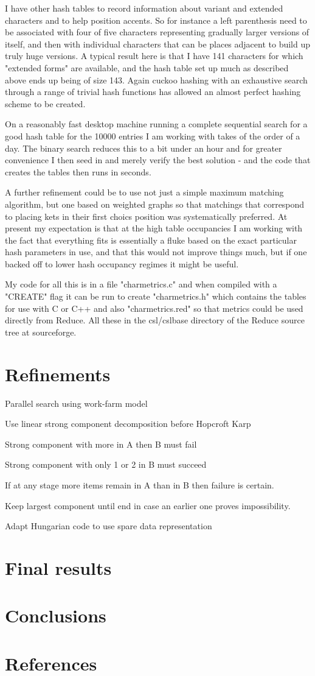 \documentclass [a4paper,11pt]{article}
\begin{document}
I have other hash tables to record information about variant and extended 
characters and to help position accents. So for instance a left 
parenthesis need to be associated with four of five characters 
representing gradually larger versions of itself, and then with individual 
characters that can be places adjacent to build up truly huge versions. 
A typical result here is that I have 141 characters for which "extended 
forms" are available, and the hash table set up much as described above 
ends up being of size 143. Again cuckoo hashing with an exhaustive search 
through a range of trivial hash functions has allowed an almost perfect 
hashing scheme to be created.

On a reasonably fast desktop machine running a complete sequential search 
for a good hash table for the 10000 entries I am working with takes of the 
order of a day. The binary search reduces this to a bit under an hour and 
for greater convenience I then seed in and merely verify the best solution 
- and the code that creates the tables then runs in seconds.

A further refinement could be to use not just a simple maximum matching 
algorithm, but one based on weighted graphs so that matchings that 
correspond to placing kets in their first choics position was 
systematically preferred. At present my expectation is that at the high 
table occupancies I am working with the fact that everything fits is 
essentially a fluke based on the exact particular hash parameters in use, 
and that this would not improve things much, but if one backed off to 
lower hash occupancy regimes it might be useful.

My code for all this is in a file "charmetrics.c" and when compiled with a 
"CREATE" flag it can be run to create "charmetrics.h" which contains the 
tables for use with C or C++ and also "charmetrics.red" so that metrics 
could be used directly from Reduce. All these in the csl/cslbase directory 
of the Reduce source tree at sourceforge.

\section{Refinements}

Parallel search using work-farm model

Use linear strong component decomposition before Hopcroft Karp

Strong component with more in A then B must fail

Strong component with only 1 or 2 in B must succeed

If at any stage more items remain in A than in B then failure is certain.

Keep largest component until end in case an earlier one proves impossibility.

Adapt Hungarian code to use spare data representation


\section{Final results}
\section{Conclusions}

\section{References}
\end{document}

